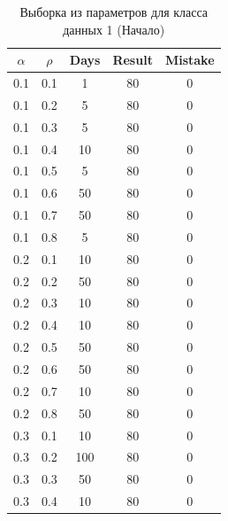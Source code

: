 \begin{center}
	\captionsetup{justification=raggedright,singlelinecheck=off}
	\begin{longtable}[c]{|c|c|c|c|c|}
		\caption{Выборка из параметров для класса данных 1 (Начало)\label{tbl:table_kd1-1}}\\ \hline
		$\alpha$ & $\rho$ & Days & Result & Mistake \\ \hline
		0.1 & 0.1 &  1 &   80 &    0 \\
		0.1 & 0.2 &  5 &   80 &    0 \\
		0.1 & 0.3 &  5 &   80 &    0 \\
		0.1 & 0.4 &  10 &   80 &    0 \\
		0.1 & 0.5 &  5 &   80 &    0 \\
		0.1 & 0.6 &  50 &   80 &    0 \\
		0.1 & 0.7 &  50 &   80 &    0 \\
		0.1 & 0.8 &  5 &    80 &    0 \\ \hline
		0.2 & 0.1 &  10 &   80 &    0 \\
		0.2 & 0.2 &  50 &   80 &    0 \\
		0.2 & 0.3 &  10 &   80 &    0 \\
		0.2 & 0.4 &  10 &   80 &    0 \\
		0.2 & 0.5 &  50 &   80 &    0 \\
		0.2 & 0.6 &  50 &   80 &    0 \\
		0.2 & 0.7 &  10 &   80 &    0 \\
		0.2 & 0.8 &  50 &  80 &    0 \\ \hline
		0.3 & 0.1 &  10 &   80 &    0 \\
		0.3 & 0.2 &  100 &   80 &    0 \\
		0.3 & 0.3 &  50 &   80 &    0 \\
		0.3 & 0.4 &  10 &   80 &    0 \\ \hline
	\end{longtable}
\end{center}

\clearpage

